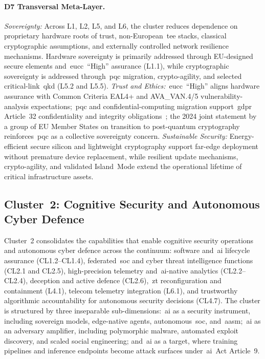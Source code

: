 \documentclass{ieeeaccess}
\begin{document}
\paragraph{D7 Transversal Meta-Layer.}
\emph{Sovereignty:} Across L1, L2, L5, and L6, the cluster reduces dependence on proprietary hardware roots of trust, non-European~\gls{tee} stacks, classical cryptographic assumptions, and externally controlled network resilience mechanisms. Hardware sovereignty is primarily addressed through EU-designed secure elements and~\gls{eucc}~``High'' assurance (L1.1), while cryptographic sovereignty is addressed through~\gls{pqc} migration, crypto-agility, and selected critical-link~\gls{qkd} (L5.2 and L5.5). \emph{Trust and Ethics:}~\gls{eucc}~``High'' aligns hardware assurance with Common Criteria EAL4+ and AVA\_VAN.4/5 vulnerability-analysis expectations;~\gls{pqc} and confidential-computing migration support~\gls{gdpr} Article~32 confidentiality and integrity obligations~\cite{eugdpr}; the 2024 joint statement by a group of EU Member States on transition to post-quantum cryptography reinforces~\gls{pqc} as a collective sovereignty concern. \emph{Sustainable Security:} Energy-efficient secure silicon and lightweight cryptography support far-edge deployment without premature device replacement, while resilient update mechanisms, crypto-agility, and validated Island~Mode extend the operational lifetime of critical infrastructure assets.

\subsection{Cluster~2: Cognitive Security and Autonomous Cyber Defence}
\label{subsec:c2}

Cluster~2 consolidates the capabilities that enable cognitive security operations and autonomous cyber defence across the continuum: software and~\gls{ai} lifecycle assurance (CL1.2--CL1.4), federated~\gls{soc} and cyber threat intelligence functions (CL2.1 and CL2.5), high-precision telemetry and~\gls{ai}-native analytics (CL2.2--CL2.4), deception and active defence (CL2.6),~\gls{zt} reconfiguration and containment (L4.1), telecom telemetry integration (L6.1), and trustworthy algorithmic accountability for autonomous security decisions (CL4.7). The cluster is structured by three inseparable sub-dimensions:~\gls{ai} as a security instrument, including sovereign models, edge-native agents, autonomous~\gls{soc}, and~\gls{aasm};~\gls{ai} as an adversary amplifier, including polymorphic malware, automated exploit discovery, and scaled social engineering; and~\gls{ai} as a target, where training pipelines and inference endpoints become attack surfaces under~\gls{ai}~Act Article~9.
\end{document}
